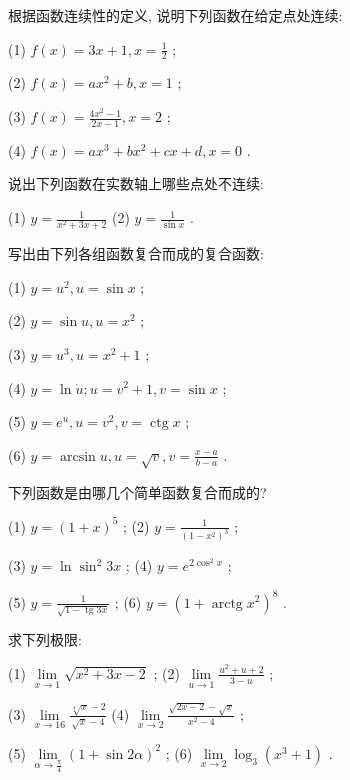 \documentclass[lang=cn,newtx,10pt,scheme=chinese]{elegantbook}
\begin{document}
\begin{problemset}[习 题 三]


\item 根据函数连续性的定义, 说明下列函数在给定点处连续:

(1) \(f\left( x\right) = {3x} + 1,x = \frac{1}{2}\) ;

(2) \(f\left( x\right) = a{x}^{2} + b,x = 1\) ;

(3) \(f\left( x\right) = \frac{4{x}^{2} - 1}{{2x} - 1},x = 2\) ;

(4) \(f\left( x\right) = a{x}^{3} + b{x}^{2} + {cx} + d,x = 0\) .

\item 说出下列函数在实数轴上哪些点处不连续:

(1) \(y = \frac{1}{{x}^{2} + {3x} + 2}\) (2) \(y = \frac{1}{\sin x}\) .

\item 写出由下列各组函数复合而成的复合函数:

(1) \(y = {u}^{2},u = \sin x\) ;

(2) \(y = \sin u,u = {x}^{2}\) ;

(3) \(y = {u}^{3},u = {x}^{2} + 1\) ;

(4) \(y = \ln \dot{u};u = {v}^{2} + 1,v = \sin x\) ;

(5) \(y = {e}^{u},u = {v}^{2},v = \operatorname{ctg}x\) ;

(6) \(y = \arcsin u,u = \sqrt{v},v = \frac{x - a}{b - a}\) .

\item 下列函数是由哪几个简单函数复合而成的?

(1) \(y = {\left( 1 + x\right) }^{5}\) ; (2) \(y = \frac{1}{{\left( 1 - {x}^{2}\right) }^{3}}\) ;

(3) \(y = \ln {\sin }^{2}{3x}\) ; (4) \(y = {e}^{2{\cos }^{2}x}\) ;

(5) \(y = \frac{1}{\sqrt{1 - \operatorname{tg}{3x}}}\) ; (6) \(y = {\left( 1 + \operatorname{arctg}{x}^{2}\right) }^{8}\) .

\item 求下列极限:

(1) \(\mathop{\lim }\limits_{{x \rightarrow 1}}\sqrt{{x}^{2} + {3x} - 2}\) ; (2) \(\mathop{\lim }\limits_{{u \rightarrow 1}}\frac{{u}^{2} + u + 2}{3 - u}\) ;

(3) \(\mathop{\lim }\limits_{{x \rightarrow {16}}}\frac{\sqrt[4]{x} - 2}{\sqrt{x} - 4}\) (4) \(\mathop{\lim }\limits_{{x \rightarrow 2}}\frac{\sqrt{{2x} - 2} - \sqrt{x}}{{x}^{2} - 4}\) ;

(5) \(\mathop{\lim }\limits_{{\alpha \rightarrow \frac{\pi }{4}}}{\left( 1 + \sin 2\alpha \right) }^{2}\) ; (6) \(\mathop{\lim }\limits_{{x \rightarrow 2}}{\log }_{3}\left( {{x}^{3} + 1}\right)\) .


\end{problemset}
\end{document}
